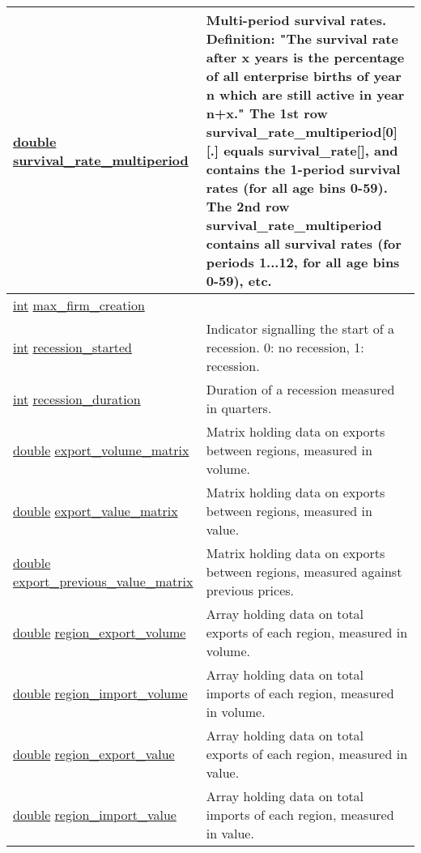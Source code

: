 \documentclass[a4paper,11pt]{article}
\begin{document}
\begin{longtable}[H!]{ll}
\midrule
\parbox{5cm}{\url{double} \url{survival_rate_multiperiod}}  & \parbox{10cm}{Multi-period survival rates. Definition: "The survival rate after x years is the percentage of all enterprise births of year n which are still active in year n+x." The 1st row survival\_rate\_multiperiod[0][.] equals survival\_rate[], and contains the 1-period survival rates (for all age bins 0-59). The 2nd row survival\_rate\_multiperiod contains all survival rates (for periods 1...12, for all age bins 0-59), etc.} \\
\midrule
\parbox{5cm}{\url{int} \url{max_firm_creation}}  & \parbox{10cm}{} \\
\midrule
\parbox{5cm}{\url{int} \url{recession_started}}  & \parbox{10cm}{Indicator signalling the start of a recession. 0: no recession, 1: recession.} \\
\midrule
\parbox{5cm}{\url{int} \url{recession_duration}}  & \parbox{10cm}{Duration of a recession measured in quarters.} \\
\midrule
\parbox{5cm}{\url{double} \url{export_volume_matrix}}  & \parbox{10cm}{Matrix holding data on exports between regions, measured in volume.} \\
\midrule
\parbox{5cm}{\url{double} \url{export_value_matrix}}  & \parbox{10cm}{Matrix holding data on exports between regions, measured in value.} \\
\midrule
\parbox{5cm}{\url{double} \url{export_previous_value_matrix}}  & \parbox{10cm}{Matrix holding data on exports between regions, measured against previous prices.} \\
\midrule
\parbox{5cm}{\url{double} \url{region_export_volume}}  & \parbox{10cm}{Array holding data on total exports of each region, measured in volume.} \\
\midrule
\parbox{5cm}{\url{double} \url{region_import_volume}}  & \parbox{10cm}{Array holding data on total imports of each region, measured in volume.} \\
\midrule
\parbox{5cm}{\url{double} \url{region_export_value}}  & \parbox{10cm}{Array holding data on total exports of each region, measured in value.} \\
\midrule
\parbox{5cm}{\url{double} \url{region_import_value}}  & \parbox{10cm}{Array holding data on total imports of each region, measured in value.} \\

\end{longtable}
\end{document}

